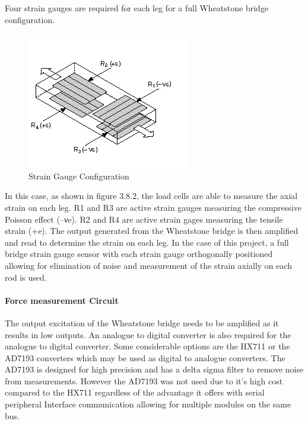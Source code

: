 Four strain gauges are required for each leg for a full Wheatstone bridge configuration. 
\begin{center}
	\begin{figure}[H]
		\centering
		\includegraphics{Figures/loadConf}
		\caption[Strain Gauge Configuration]{Strain Gauge Configuration \cite{noauthor_measuring_nodate}}
	\end{figure}
\end{center}
In this case, as shown in figure 3.8.2, the load cells are able to measure the axial strain on each leg. R1 and R3 are active strain gauges measuring the compressive Poisson effect (–νe). R2 and R4 are active strain gages measuring the tensile strain (+e). The output generated from the Wheatstone bridge is then amplified and read to determine the strain on each leg.
In the case of this project, a full bridge strain gauge sensor with each strain gauge orthogonally positioned allowing for elimination of noise and measurement of the strain axially on each rod is used.

\paragraph{Force measurement Circuit}
The output excitation of the Wheatstone bridge needs to be amplified as it results in low outputs. An analogue to digital converter is also required for the analogue to digital converter. Some considerable options are the HX711 or the AD7193 converters which may be used as digital to analogue converters. The AD7193 is designed for high precision and has a delta sigma filter to remove noise from measurements.  However the AD7193 was not used due to it's high cost compared to the HX711 regardless of the advantage it offers with serial peripheral Interface communication allowing for multiple modules on the same bus.

